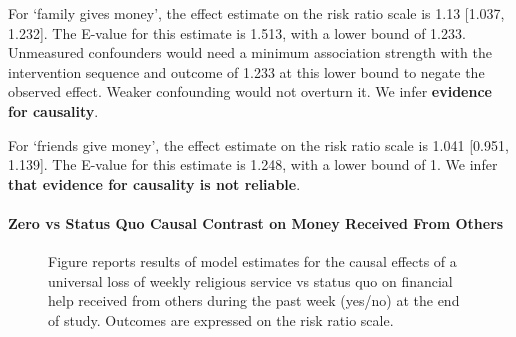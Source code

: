\documentclass[
  single column]{article}
\let\oldparagraph\paragraph
\renewcommand{\paragraph}[1]{\oldparagraph{#1}\mbox{}}
\begin{document}
For `family gives money', the effect estimate on the risk ratio scale is
1.13 {[}1.037, 1.232{]}. The E-value for this estimate is 1.513, with a
lower bound of 1.233. Unmeasured confounders would need a minimum
association strength with the intervention sequence and outcome of 1.233
at this lower bound to negate the observed effect. Weaker confounding
would not overturn it. We infer \textbf{evidence for causality}.

For `friends give money', the effect estimate on the risk ratio scale is
1.041 {[}0.951, 1.139{]}. The E-value for this estimate is 1.248, with a
lower bound of 1. We infer \textbf{that evidence for causality is not
reliable}.

\newpage{}

\paragraph{Zero vs Status Quo Causal Contrast on Money Received From
Others}\label{zero-vs-status-quo-causal-contrast-on-money-received-from-others}

\begin{figure}


\caption{\label{fig-3_3}Figure reports results of model estimates for
the causal effects of a universal loss of weekly religious service vs
status quo on financial help received from others during the past week
(yes/no) at the end of study. Outcomes are expressed on the risk ratio
scale.}

\end{figure}%
\end{document}
